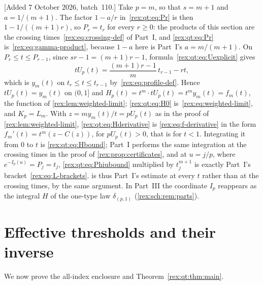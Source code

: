 \begin{remark}\label{rex:qt:rem:identify}
[Added 7 October 2026, batch~110.] Take $p=m$, so that $s=m+1$ and
$a=1/(m+1)$. The factor $1-a/r$ in~\eqref{rex:qt:eq:Pr} is then
$1-1/((m+1)r)$, so $P_r=t_r$ for every $r\geq0$: the products of this
section are the crossing times~\eqref{rex:eq:crossing-def} of Part~I, and
\eqref{rex:qt:eq:Pr} is~\eqref{rex:eq:gamma-product}, because $1-a$ here is
Part~I's $a=m/(m+1)$. On $P_r\le t\le P_{r-1}$, since $sr-1=(m+1)r-1$,
formula~\eqref{rex:qt:eq:Uexplicit} gives
\[
 tU_p(t)=\frac{(m+1)r-1}{m}\,t_{r-1}-rt,
\]
which is $y_m(t)$ on $t_r\le t\le t_{r-1}$ by~\eqref{rex:eq:profile-def}.
Hence $tU_p(t)=y_m(t)$ on $(0,1]$ and
$H_p(t)=t^{m}\cdot tU_p(t)=t^my_m(t)=f_m(t)$, the function of
\cref{rex:lem:weighted-limit}; \eqref{rex:qt:eq:H0} is~\eqref{rex:eq:weighted-limit},
and $K_p=L_m$. With $z=my_m(t)/t=pU_p(t)$ as in the proof of
\cref{rex:lem:weighted-limit}, \eqref{rex:qt:eq:Hderivative} is
\eqref{rex:eq:f-derivative} in the form $f_m'(t)=t^m(z-C(z))$, for
$pU_p(t)>0$, that is for $t<1$. Integrating it from $0$ to $t$ is
\eqref{rex:qt:eq:Hbound}; Part~I performs the same integration at the
crossing times in the proof of \cref{rex:prop:certificates}, and at
$u=j/p$, where $e^{-I_p(u)}=P_j=t_j$, \eqref{rex:qt:eq:Phiubound}
multiplied by $t_j^{m+1}$ is exactly Part~I's
bracket~\eqref{rex:eq:L-brackets}.  is thus
Part~I's estimate at every $t$ rather than at the crossing times, by the
same argument. In Part~III the coordinate $I_p$ reappears as the integral
$H$ of the one-type law $\delta_{(p,1)}$ (\cref{rex:sch:rem:parts}).
\end{remark}

\section{Effective thresholds and their inverse}\label{rex:qt:sec:thresholdproof}
We now prove the all-index enclosure and Theorem~\ref{rex:qt:thm:main}.

